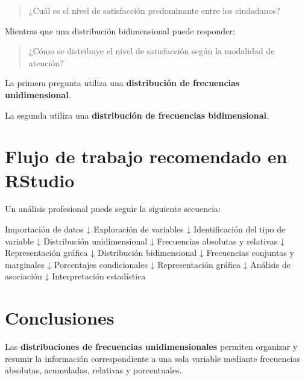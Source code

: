 \documentclass[
  spanish,
  14pt,
  letterpaper,
  DIV=11,
  numbers=noendperiod]{scrartcl}
\newenvironment{Shaded}{\begin{snugshade}}{\end{snugshade}}
\newcommand{\NormalTok}[1]{\textcolor[rgb]{0.97,0.97,0.95}{#1}}
\begin{document}
\begin{quote}
¿Cuál es el nivel de satisfacción predominante entre los ciudadanos?
\end{quote}

Mientras que una distribución bidimensional puede responder:

\begin{quote}
¿Cómo se distribuye el nivel de satisfacción según la modalidad de
atención?
\end{quote}

La primera pregunta utiliza una \textbf{distribución de frecuencias
unidimensional}.

La segunda utiliza una \textbf{distribución de frecuencias
bidimensional}.

\section{Flujo de trabajo recomendado en
RStudio}\label{flujo-de-trabajo-recomendado-en-rstudio}

Un análisis profesional puede seguir la siguiente secuencia:

\begin{Shaded}
\begin{Highlighting}[]
\NormalTok{Importación de datos}
\NormalTok{        ↓}
\NormalTok{Exploración de variables}
\NormalTok{        ↓}
\NormalTok{Identificación del tipo de variable}
\NormalTok{        ↓}
\NormalTok{Distribución unidimensional}
\NormalTok{        ↓}
\NormalTok{Frecuencias absolutas y relativas}
\NormalTok{        ↓}
\NormalTok{Representación gráfica}
\NormalTok{        ↓}
\NormalTok{Distribución bidimensional}
\NormalTok{        ↓}
\NormalTok{Frecuencias conjuntas y marginales}
\NormalTok{        ↓}
\NormalTok{Porcentajes condicionales}
\NormalTok{        ↓}
\NormalTok{Representación gráfica}
\NormalTok{        ↓}
\NormalTok{Análisis de asociación}
\NormalTok{        ↓}
\NormalTok{Interpretación estadística}
\end{Highlighting}
\end{Shaded}

\section{Conclusiones}\label{conclusiones}

Las \textbf{distribuciones de frecuencias unidimensionales} permiten
organizar y resumir la información correspondiente a una sola variable
mediante frecuencias absolutas, acumuladas, relativas y porcentuales.
\end{document}
